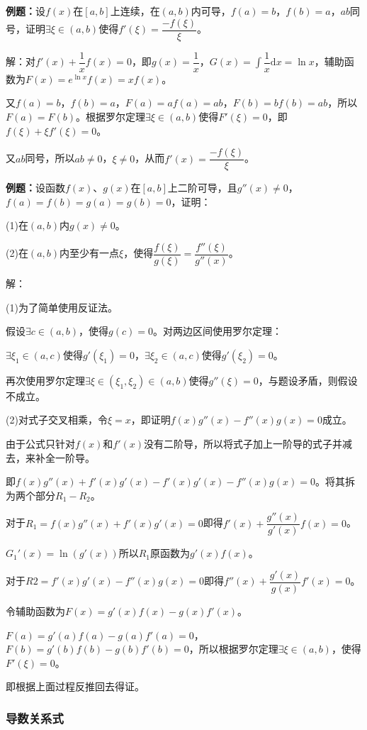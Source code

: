 \textbf{例题：}设$f(x)$在$[a,b]$上连续，在$(a,b)$内可导，$f(a)=b$，$f(b)=a$，$ab$同号，证明$\exists\xi\in(a,b)$使得$f'(\xi)=\dfrac{-f(\xi)}{\xi}$。

解：对$f'(x)+\dfrac{1}{x}f(x)=0$，即$g(x)=\dfrac{1}{x}$，$G(x)=\int\dfrac{1}{x}\textrm{d}x=\ln x$，辅助函数为$F(x)=e^{\ln x}f(x)=xf(x)$。

又$f(a)=b$，$f(b)=a$，$F(a)=af(a)=ab$，$F(b)=bf(b)=ab$，所以$F(a)=F(b)$。根据罗尔定理$\exists\xi\in(a,b)$使得$F'(\xi)=0$，即$f(\xi)+\xi f'(\xi)=0$。

又$ab$同号，所以$ab\neq0$，$\xi\neq0$，从而$f'(x)=\dfrac{-f(\xi)}{\xi}$。

\textbf{例题：}设函数$f(x)$、$g(x)$在$[a,b]$上二阶可导，且$g''(x)\neq0$，$f(a)=f(b)=g(a)=g(b)=0$，证明：

(1)在$(a,b)$内$g(x)\neq0$。

(2)在$(a,b)$内至少有一点$\xi$，使得$\dfrac{f(\xi)}{g(\xi)}=\dfrac{f''(\xi)}{g''(x)}$。

解：

(1)为了简单使用反证法。

假设$\exists c\in(a,b)$，使得$g(c)=0$。对两边区间使用罗尔定理：

$\exists\xi_1\in(a,c)$使得$g'(\xi_1)=0$，$\exists\xi_2\in(a,c)$使得$g'(\xi_2)=0$。

再次使用罗尔定理$\exists\xi\in(\xi_1,\xi_2)\in(a,b)$使得$g''(\xi)=0$，与题设矛盾，则假设不成立。

(2)对式子交叉相乘，令$\xi=x$，即证明$f(x)g''(x)-f''(x)g(x)=0$成立。

由于公式只针对$f(x)$和$f'(x)$没有二阶导，所以将式子加上一阶导的式子并减去，来补全一阶导。

即$f(x)g''(x)+f'(x)g'(x)-f'(x)g'(x)-f''(x)g(x)=0$。将其拆为两个部分$R_1-R_2$。

对于$R_1=f(x)g''(x)+f'(x)g'(x)=0$即得$f'(x)+\dfrac{g''(x)}{g'(x)}f(x)=0$。

$G_1'(x)=\ln(g'(x))$所以$R_1$原函数为$g'(x)f(x)$。

对于$R2=f'(x)g'(x)-f''(x)g(x)=0$即得$f''(x)+\dfrac{g'(x)}{g(x)}f'(x)=0$。

令辅助函数为$F(x)=g'(x)f(x)-g(x)f'(x)$。

$F(a)=g'(a)f(a)-g(a)f'(a)=0$，$F(b)=g'(b)f(b)-g(b)f'(b)=0$，所以根据罗尔定理$\exists\xi\in(a,b)$，使得$F'(\xi)=0$。

即根据上面过程反推回去得证。

\subsubsection{导数关系式}

